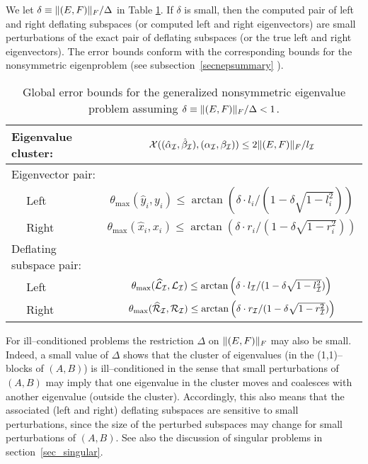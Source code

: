 We let $\delta \equiv \|(E,F)\|_F / {\Delta}$ in Table \ref{global}.
If $\delta$ is small, then the computed pair of left and right deflating
subspaces (or computed left and right eigenvectors) are small perturbations of
the exact pair of deflating subspaces (or the true left and right eigenvectors).
The error bounds conform with the corresponding bounds for the nonsymmetric
eigenproblem (see subsection~\ref{secnepsummary} ).

\begin{table}[h]
\caption{ Global error bounds for the generalized nonsymmetric
eigenvalue problem assuming $\delta \equiv \|(E,F)\|_F/{\Delta} < 1$.}
\label{global}
\begin{center}
\begin{tabular}{|l|c|} \hline
Eigenvalue cluster: &
  ${\cal X}( ({\hat{\alpha}}_{\cal I},{\hat{\beta}}_{\cal I}),
             ({\alpha}_{\cal I},{\beta}_{\cal I}) )
    \leq 2 \|(E,F)\|_F/ l_{\cal I}$  \\ \hline
Eigenvector pair: &  \\
~~ Left & $\theta_{\max} (\hat{y}_i , y_i) \leq
\arctan \left(
{\delta \cdot l_i}/{(1 - \delta \sqrt{1 - l_i^2})}
\right)$  \\
~~ Right  & $\theta_{\max} (\hat{x}_i , x_i) \leq
\arctan \left(
{\delta \cdot r_i}/{(1 - \delta \sqrt{1 - r_i^2})}
\right)$ \\
\hline
Deflating subspace pair: &  \\
~~ Left & $\theta_{\max} ({\widehat{{\cal L}}}_{\cal I},{\cal L}_{\cal I})\leq
\arctan \left(
{\delta \cdot l_{\cal I}}/{(1 - \delta \sqrt{1 - l_{\cal I}^2})}
\right)$  \\
~~ Right & $\theta_{\max}({\widehat{{\cal R}}}_{\cal I},{\cal R}_{\cal I})\leq
\arctan \left(
{\delta \cdot r_{\cal I}}/{(1 - \delta \sqrt{1 - r_{\cal I}^2 })}
\right)$ \\
\hline
\end{tabular}
\end{center}
\end{table}

For ill--conditioned problems the restriction $\Delta$
on $\|(E,F)\|_F$ may also be small.
Indeed, a small value of $\Delta$ shows that the cluster of
eigenvalues (in the (1,1)--blocks of $(A, B)$) is ill--conditioned in
the sense that small perturbations of $(A, B)$ may imply that one eigenvalue in
the cluster moves and coalesces with another eigenvalue (outside the cluster).
Accordingly, this also means that the associated (left and right)
deflating subspaces are sensitive to small perturbations,
since the size of the
perturbed subspaces may change for small perturbations of $(A, B)$.
See also the discussion of singular problems in section~\ref{sec_singular}.

